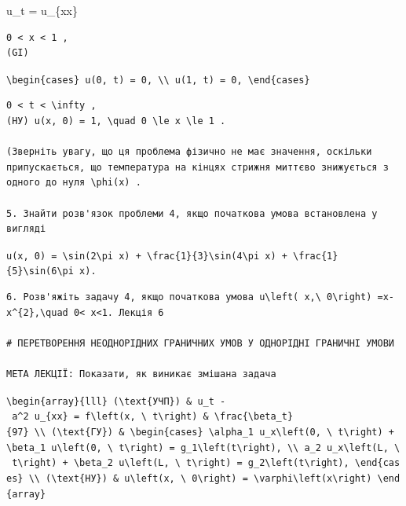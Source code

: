 \documentclass[
  ukrainian,
]{article}
\begin{document}
u\_t = u\_\{xx\}

\begin{verbatim}
0 < x < 1 , 
(GI)
\end{verbatim}

\texttt{\textbackslash{}begin\{cases\}\ u(0,\ t)\ =\ 0,\ \textbackslash{}\textbackslash{}\ u(1,\ t)\ =\ 0,\ \textbackslash{}end\{cases\}}

\begin{verbatim}
0 < t < \infty , 
(НУ) u(x, 0) = 1, \quad 0 \le x \le 1 .

(Зверніть увагу, що ця проблема фізично не має значення, оскільки припускається, що температура на кінцях стрижня миттєво знижується з одного до нуля \phi(x) .

5. Знайти розв'язок проблеми 4, якщо початкова умова встановлена у вигляді
\end{verbatim}

\texttt{u(x,\ 0)\ =\ \textbackslash{}sin(2\textbackslash{}pi\ x)\ +\ \textbackslash{}frac\{1\}\{3\}\textbackslash{}sin(4\textbackslash{}pi\ x)\ +\ \textbackslash{}frac\{1\}\{5\}\textbackslash{}sin(6\textbackslash{}pi\ x).}

\begin{verbatim}
6. Розв'яжіть задачу 4, якщо початкова умова u\left( x,\ 0\right) =x-x^{2},\quad 0< x<1. Лекція 6

# ПЕРЕТВОРЕННЯ НЕОДНОРІДНИХ ГРАНИЧНИХ УМОВ У ОДНОРІДНІ ГРАНИЧНІ УМОВИ

МЕТА ЛЕКЦІЇ: Показати, як виникає змішана задача
\end{verbatim}

\texttt{\textbackslash{}begin\{array\}\{lll\}\ (\textbackslash{}text\{УЧП\})\ \&\ u\_t\ -\ a\^{}2\ u\_\{xx\}\ =\ f\textbackslash{}left(x,\ \textbackslash{}\ t\textbackslash{}right)\ \&\ \textbackslash{}frac\{\textbackslash{}beta\_t\}\{97\}\ \textbackslash{}\textbackslash{}\ (\textbackslash{}text\{ГУ\})\ \&\ \textbackslash{}begin\{cases\}\ \textbackslash{}alpha\_1\ u\_x\textbackslash{}left(0,\ \textbackslash{}\ t\textbackslash{}right)\ +\ \textbackslash{}beta\_1\ u\textbackslash{}left(0,\ \textbackslash{}\ t\textbackslash{}right)\ =\ g\_1\textbackslash{}left(t\textbackslash{}right),\ \textbackslash{}\textbackslash{}\ a\_2\ u\_x\textbackslash{}left(L,\ \textbackslash{}\ t\textbackslash{}right)\ +\ \textbackslash{}beta\_2\ u\textbackslash{}left(L,\ \textbackslash{}\ t\textbackslash{}right)\ =\ g\_2\textbackslash{}left(t\textbackslash{}right),\ \textbackslash{}end\{cases\}\ \textbackslash{}\textbackslash{}\ (\textbackslash{}text\{HУ\})\ \&\ u\textbackslash{}left(x,\ \textbackslash{}\ 0\textbackslash{}right)\ =\ \textbackslash{}varphi\textbackslash{}left(x\textbackslash{}right)\ \textbackslash{}end\{array\}}
\end{document}
